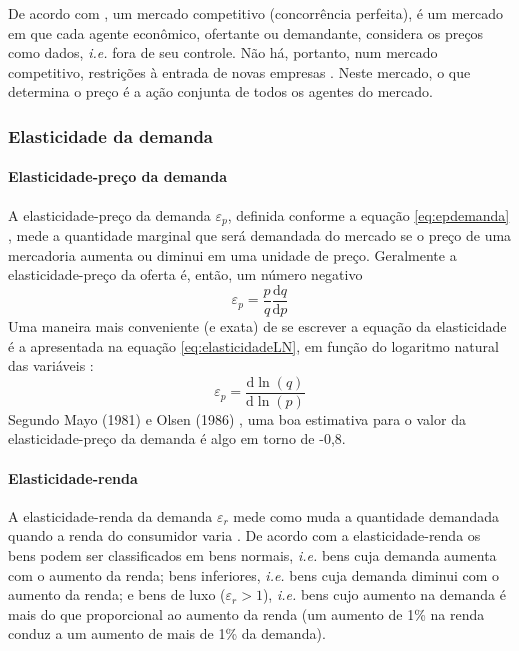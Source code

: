 \documentclass[
	12pt,				%
	oneside,			%
	a4paper,			%
	chapter=TITLE,		%
	section=TITLE,		%
	english,			%
	brazil				%
	]{abntex2}
\begin{document}
De acordo com \textcite[p.~310]{varian}, um mercado competitivo (concorrência perfeita),
é um mercado em que cada agente econômico, ofertante ou demandante, considera os
preços como dados, \emph{i.e.} fora de seu controle. Não há, portanto, num mercado
competitivo, restrições à entrada de novas empresas \autocite[p.~433]{varian}. Neste
mercado, o que determina o preço é a ação conjunta de todos os agentes do
mercado.

\hypertarget{elasticidade-da-demanda}{%
\subsubsection{Elasticidade da demanda}\label{elasticidade-da-demanda}}

\hypertarget{elasticidade-preuxe7o-da-demanda}{%
\paragraph{Elasticidade-preço da demanda}\label{elasticidade-preuxe7o-da-demanda}}

A elasticidade-preço da demanda \(\varepsilon_p\), definida conforme a equação
\eqref{eq:epdemanda} \autocite[p.~302]{varian}, mede a quantidade marginal que será
demandada do mercado se o preço de uma mercadoria aumenta ou diminui em uma
unidade de preço. Geralmente a elasticidade-preço da oferta é, então, um número
negativo \autocite[289]{varian}
\begin{equation}
\varepsilon_p = \frac{p}{q}\frac{\mathrm{d} q}{\mathrm{d} p}
\label{eq:epdemanda}
\end{equation}
Uma maneira mais conveniente (e exata) de se escrever a equação da elasticidade
é a apresentada na equação \eqref{eq:elasticidadeLN}, em função do logaritmo
natural das variáveis \autocite[p.307-308]{varian}:
\begin{equation}
\varepsilon_p = \frac{\mathrm{d} \ln(q)}{\mathrm{d} \ln(p)}
\label{eq:elasticidadeLN}
\end{equation}
Segundo Mayo (1981) e Olsen (1986) \autocite[\emph{apud}][p.23]{Malpezzi2002TheRO}, uma boa
estimativa para o valor da elasticidade-preço da demanda é algo em torno de -0,8.

\hypertarget{elasticidade-renda}{%
\paragraph{Elasticidade-renda}\label{elasticidade-renda}}

A elasticidade-renda da demanda \(\varepsilon_r\) mede como muda a quantidade
demandada quando a renda do consumidor varia \autocite[p.300]{varian}. De acordo com a
elasticidade-renda os bens podem ser classificados em bens normais, \emph{i.e.} bens
cuja demanda aumenta com o aumento da renda; bens inferiores, \emph{i.e.} bens cuja
demanda diminui com o aumento da renda; e bens de luxo (\(\varepsilon_r > 1\)),
\emph{i.e.} bens cujo aumento na demanda é mais do que proporcional ao aumento da
renda (um aumento de 1\% na renda conduz a um aumento de mais de 1\% da demanda).
\end{document}
